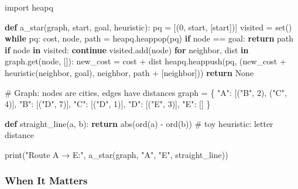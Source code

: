 \documentclass[
  letterpaper,
  DIV=11,
  numbers=noendperiod]{scrreprt}
\newenvironment{Shaded}{\begin{snugshade}}{\end{snugshade}}
\newcommand{\BuiltInTok}[1]{\textcolor[rgb]{0.00,0.23,0.31}{#1}}
\newcommand{\CommentTok}[1]{\textcolor[rgb]{0.37,0.37,0.37}{#1}}
\newcommand{\ControlFlowTok}[1]{\textcolor[rgb]{0.00,0.23,0.31}{\textbf{#1}}}
\newcommand{\DecValTok}[1]{\textcolor[rgb]{0.68,0.00,0.00}{#1}}
\newcommand{\ImportTok}[1]{\textcolor[rgb]{0.00,0.46,0.62}{#1}}
\newcommand{\KeywordTok}[1]{\textcolor[rgb]{0.00,0.23,0.31}{\textbf{#1}}}
\newcommand{\NormalTok}[1]{\textcolor[rgb]{0.00,0.23,0.31}{#1}}
\newcommand{\OperatorTok}[1]{\textcolor[rgb]{0.37,0.37,0.37}{#1}}
\newcommand{\StringTok}[1]{\textcolor[rgb]{0.13,0.47,0.30}{#1}}
\newcommand{\VariableTok}[1]{\textcolor[rgb]{0.07,0.07,0.07}{#1}}
\begin{document}
\begin{Shaded}
\begin{Highlighting}[]
\ImportTok{import}\NormalTok{ heapq}

\KeywordTok{def}\NormalTok{ a\_star(graph, start, goal, heuristic):}
\NormalTok{    pq }\OperatorTok{=}\NormalTok{ [(}\DecValTok{0}\NormalTok{, start, [start])]}
\NormalTok{    visited }\OperatorTok{=} \BuiltInTok{set}\NormalTok{()}
    \ControlFlowTok{while}\NormalTok{ pq:}
\NormalTok{        cost, node, path }\OperatorTok{=}\NormalTok{ heapq.heappop(pq)}
        \ControlFlowTok{if}\NormalTok{ node }\OperatorTok{==}\NormalTok{ goal:}
            \ControlFlowTok{return}\NormalTok{ path}
        \ControlFlowTok{if}\NormalTok{ node }\KeywordTok{in}\NormalTok{ visited:}
            \ControlFlowTok{continue}
\NormalTok{        visited.add(node)}
        \ControlFlowTok{for}\NormalTok{ neighbor, dist }\KeywordTok{in}\NormalTok{ graph.get(node, []):}
\NormalTok{            new\_cost }\OperatorTok{=}\NormalTok{ cost }\OperatorTok{+}\NormalTok{ dist}
\NormalTok{            heapq.heappush(pq, (new\_cost }\OperatorTok{+}\NormalTok{ heuristic(neighbor, goal), neighbor, path }\OperatorTok{+}\NormalTok{ [neighbor]))}
    \ControlFlowTok{return} \VariableTok{None}

\CommentTok{\# Graph: nodes are cities, edges have distances}
\NormalTok{graph }\OperatorTok{=}\NormalTok{ \{}
    \StringTok{"A"}\NormalTok{: [(}\StringTok{"B"}\NormalTok{, }\DecValTok{2}\NormalTok{), (}\StringTok{"C"}\NormalTok{, }\DecValTok{4}\NormalTok{)],}
    \StringTok{"B"}\NormalTok{: [(}\StringTok{"D"}\NormalTok{, }\DecValTok{7}\NormalTok{)],}
    \StringTok{"C"}\NormalTok{: [(}\StringTok{"D"}\NormalTok{, }\DecValTok{1}\NormalTok{)],}
    \StringTok{"D"}\NormalTok{: [(}\StringTok{"E"}\NormalTok{, }\DecValTok{3}\NormalTok{)],}
    \StringTok{"E"}\NormalTok{: []}
\NormalTok{\}}

\KeywordTok{def}\NormalTok{ straight\_line(a, b):}
    \ControlFlowTok{return} \BuiltInTok{abs}\NormalTok{(}\BuiltInTok{ord}\NormalTok{(a) }\OperatorTok{{-}} \BuiltInTok{ord}\NormalTok{(b))  }\CommentTok{\# toy heuristic: letter distance}

\BuiltInTok{print}\NormalTok{(}\StringTok{"Route A → E:"}\NormalTok{, a\_star(graph, }\StringTok{"A"}\NormalTok{, }\StringTok{"E"}\NormalTok{, straight\_line))}
\end{Highlighting}
\end{Shaded}

\subsubsection{When It Matters}\label{when-it-matters-86}
\end{document}
